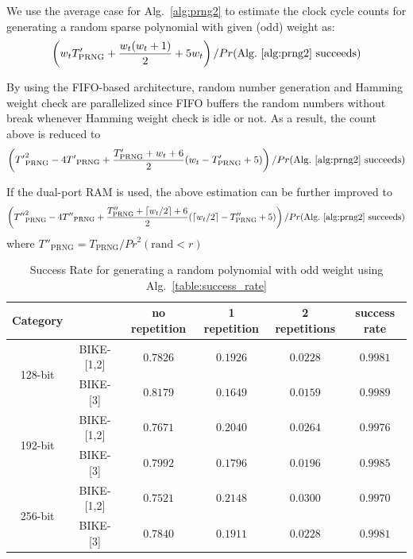 \documentclass[preprint]{iacrtrans}
\begin{document}
We use the average case for Alg.~\ref{alg:prng2} to estimate the clock cycle counts for generating a random sparse polynomial with given (odd) weight as:
\[
   \left(w_tT'_{\text{PRNG}} + \frac{w_t(w_t+1)}{2} + 5w_t\right)/Pr(\text{Alg.~\ref{alg:prng2} succeeds})
\]

By using the FIFO-based architecture, random number generation and Hamming weight check are parallelized since FIFO buffers the random numbers without break whenever Hamming weight check is idle or not. As a result, the count above is reduced to
\[
    \left({T'}_{\text{PRNG}}^2 - 4{T'}_{\text{PRNG}} + \frac{T'_{\text{PRNG}}+w_t+6}{2}(w_t-T'_{\text{PRNG}}+5)\right)/Pr(\text{Alg.~\ref{alg:prng2} succeeds})
\]

If the dual-port RAM is used, the above estimation can be further improved to
\[
    \left({T''}_{\text{PRNG}}^2 - 4{T''}_{\text{PRNG}} + \frac{T''_{\text{PRNG}}+\lceil w_t/2\rceil+6}{2}(\lceil w_t/2\rceil-T''_{\text{PRNG}}+5)\right)/Pr(\text{Alg.~\ref{alg:prng2} succeeds})
\]
where ${T''}_{\text{PRNG}}=T_{\text{PRNG}}/{Pr}^2(\text{rand} < r)$

\begin{table}[!tb]\centering
\caption{Success Rate for generating a random polynomial with odd weight using Alg.~\ref{table:success_rate}}
\begin{tabular}{cc|cccc}
  \hline
 \textbf{Category}        &             & no repetition & 1 repetition & 2 repetitions & success rate \\\hline
\multirow{ 2}{*}{128-bit} &  BIKE-[1,2] & $0.7826$ & $0.1926$  & $0.0228$  & $0.9981$\\
                    &  BIKE-[3] & $0.8179$ & $0.1649$  & $0.0159$  & $0.9989$\\
  \hline
\multirow{ 2}{*}{192-bit} &  BIKE-[1,2] & $0.7671$ & $0.2040$  & $0.0264$  & $0.9976$\\
                    &  BIKE-[3] & $0.7992$ & $0.1796$  & $0.0196$  & $0.9985$\\
  \hline
\multirow{ 2}{*}{256-bit} &  BIKE-[1,2] & $0.7521$ & $0.2148$  & $0.0300$  & $0.9970$\\
                    &  BIKE-[3] & $0.7840$ & $0.1911$  & $0.0228$  & $0.9981$\\
  \hline
\end{tabular}
\end{table}
\end{document}
